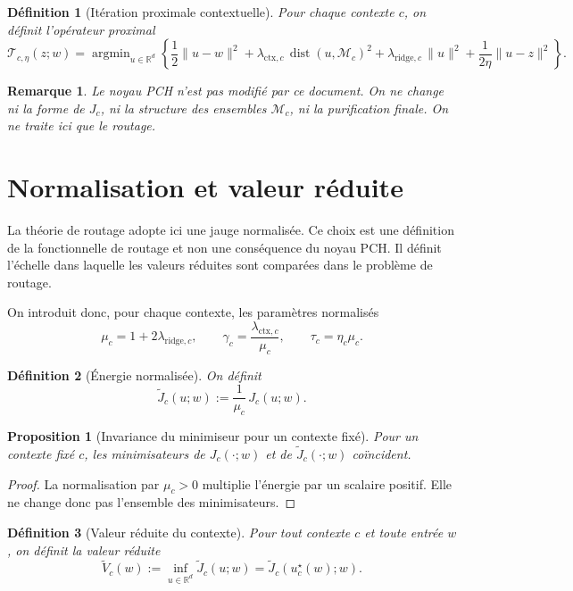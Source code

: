 \documentclass[11pt,a4paper]{article}
\newtheorem{definition}{Définition}[section]
\newtheorem{proposition}{Proposition}[section]
\newtheorem{remark}{Remarque}[section]
\DeclareMathOperator{\argmin}{argmin}
\DeclareMathOperator{\dist}{dist}
\newcommand{\R}{\mathbb R}
\newcommand{\Mcal}{\mathcal M}
\newcommand{\Tcal}{\mathcal T}
\begin{document}
\begin{definition}[Itération proximale contextuelle]
Pour chaque contexte \(c\), on définit l'opérateur proximal
\[
\Tcal_{c,\eta}(z;w)
=
\argmin_{u\in\R^d}
\left\{
\frac12\|u-w\|^2
+
\lambda_{\mathrm{ctx},c}\,\dist(u,\Mcal_c)^2
+
\lambda_{\mathrm{ridge},c}\,\|u\|^2
+
\frac{1}{2\eta}\|u-z\|^2
\right\}.
\]
\end{definition}

\begin{remark}
Le noyau PCH n'est pas modifié par ce document. On ne change ni la forme de \(J_c\), ni la structure des ensembles \(\Mcal_c\), ni la purification finale. On ne traite ici que le routage.
\end{remark}

\section{Normalisation et valeur réduite}

La théorie de routage adopte ici une jauge normalisée. Ce choix est une définition de la fonctionnelle de routage et non une conséquence du noyau PCH. Il définit l'échelle dans laquelle les valeurs réduites sont comparées dans le problème de routage.

On introduit donc, pour chaque contexte, les paramètres normalisés
\[
\mu_c = 1 + 2\lambda_{\mathrm{ridge},c},
\qquad
\gamma_c = \frac{\lambda_{\mathrm{ctx},c}}{\mu_c},
\qquad
\tau_c = \eta_c \mu_c.
\]

\begin{definition}[Énergie normalisée]
On définit
\[
\widetilde J_c(u;w) := \frac{1}{\mu_c}\,J_c(u;w).
\]
\end{definition}

\begin{proposition}[Invariance du minimiseur pour un contexte fixé]
Pour un contexte fixé \(c\), les minimisateurs de \(J_c(\cdot;w)\) et de \(\widetilde J_c(\cdot;w)\) coïncident.
\end{proposition}

\begin{proof}
La normalisation par \(\mu_c>0\) multiplie l'énergie par un scalaire positif. Elle ne change donc pas l'ensemble des minimisateurs.
\end{proof}

\begin{definition}[Valeur réduite du contexte]
Pour tout contexte \(c\) et toute entrée \(w\), on définit la valeur réduite
\[
\widetilde V_c(w)
:=
\inf_{u\in\R^d}\widetilde J_c(u;w)
=
\widetilde J_c(u_c^\star(w);w).
\]
\end{definition}
\end{document}
